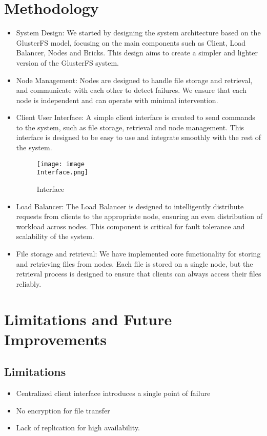 \documentclass[a4paper,12pt]{article}
\begin{document}
\section{Methodology}

\begin{itemize}
    \item System Design: We started by designing the system architecture based on the GlusterFS model, focusing on the main components such as Client, Load Balancer, Nodes and Bricks. This design aims to create a simpler and lighter version of the GlusterFS system.
    \item Node Management: Nodes are designed to handle file storage and retrieval, and communicate with each other to detect failures. We ensure that each node is independent and can operate with minimal intervention.
    \item Client User Interface: A simple client interface is created to send commands to the system, such as file storage, retrieval and node management. This interface is designed to be easy to use and integrate smoothly with the rest of the system.
         \begin{figure}[htbp]
        \centering
        \texttt{[image: image\\Interface.png]}
        \caption{Interface}
        \label{fig:enter-label}
    \end{figure}
        \item 
Load Balancer: The Load Balancer is designed to intelligently distribute requests from clients to the appropriate node, ensuring an even distribution of workload across nodes. This component is critical for fault tolerance and scalability of the system.
    \item File storage and retrieval: We have implemented core functionality for storing and retrieving files from nodes. Each file is stored on a single node, but the retrieval process is designed to ensure that clients can always access their files reliably.
\end{itemize}



\section{Limitations and Future Improvements}
 \subsection{Limitations}
 \begin{itemize}
     \item Centralized client interface introduces a single point of failure
     \item No encryption for file transfer
     \item Lack of replication for high availability.
 \end{itemize}
\end{document}
